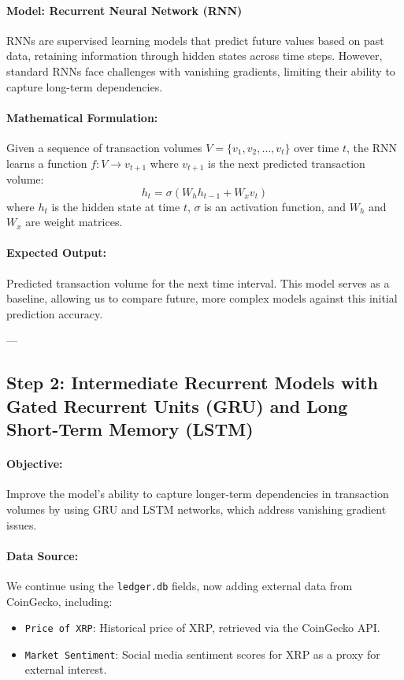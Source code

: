 \documentclass{article}
\begin{document}
\paragraph{Model: Recurrent Neural Network (RNN)}
RNNs are supervised learning models that predict future values based on past data, retaining information through hidden states across time steps. However, standard RNNs face challenges with vanishing gradients, limiting their ability to capture long-term dependencies.

\paragraph{Mathematical Formulation:}
Given a sequence of transaction volumes $V = \{v_1, v_2, \dots, v_t\}$ over time $t$, the RNN learns a function $f: V \rightarrow v_{t+1}$ where $v_{t+1}$ is the next predicted transaction volume:
\[
h_t = \sigma(W_h h_{t-1} + W_x v_t)
\]
where $h_t$ is the hidden state at time $t$, $\sigma$ is an activation function, and $W_h$ and $W_x$ are weight matrices.

\paragraph{Expected Output:} 
Predicted transaction volume for the next time interval. This model serves as a baseline, allowing us to compare future, more complex models against this initial prediction accuracy.

---

\subsection{Step 2: Intermediate Recurrent Models with Gated Recurrent Units (GRU) and Long Short-Term Memory (LSTM)}

\paragraph{Objective:} Improve the model’s ability to capture longer-term dependencies in transaction volumes by using GRU and LSTM networks, which address vanishing gradient issues.

\paragraph{Data Source:} 
We continue using the \texttt{ledger.db} fields, now adding external data from CoinGecko, including:
\begin{itemize}
    \item \texttt{Price of XRP}: Historical price of XRP, retrieved via the CoinGecko API.
    \item \texttt{Market Sentiment}: Social media sentiment scores for XRP as a proxy for external interest.
\end{itemize}
\end{document}
